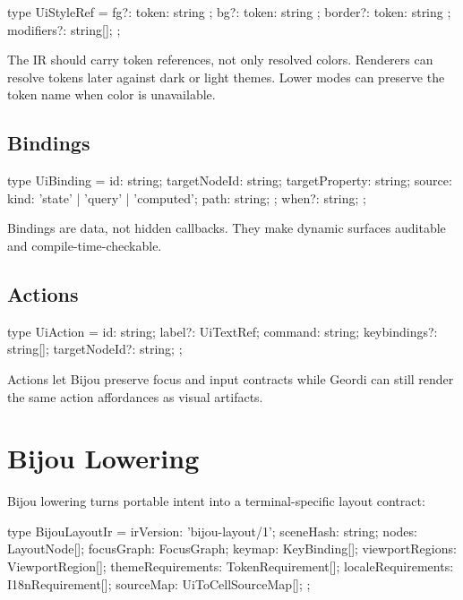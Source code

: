 \begin{CodeBlock}
type UiStyleRef = {
  fg?: { token: string };
  bg?: { token: string };
  border?: { token: string };
  modifiers?: string[];
};
\end{CodeBlock}

The IR should carry token references, not only resolved colors. Renderers can resolve tokens later against dark or light themes. Lower modes can preserve the token name when color is unavailable.

\subsection{Bindings}\label{record-138-bindings}

\begin{CodeBlock}
type UiBinding = {
  id: string;
  targetNodeId: string;
  targetProperty: string;
  source: {
    kind: 'state' | 'query' | 'computed';
    path: string;
  };
  when?: string;
};
\end{CodeBlock}

Bindings are data, not hidden callbacks. They make dynamic surfaces auditable and compile-time-checkable.

\subsection{Actions}\label{record-138-actions}

\begin{CodeBlock}
type UiAction = {
  id: string;
  label?: UiTextRef;
  command: string;
  keybindings?: string[];
  targetNodeId?: string;
};
\end{CodeBlock}

Actions let Bijou preserve focus and input contracts while Geordi can still render the same action affordances as visual artifacts.

\section{Bijou Lowering}\label{record-138-bijou-lowering}

Bijou lowering turns portable intent into a terminal-specific layout contract:

\begin{CodeBlock}
type BijouLayoutIr = {
  irVersion: 'bijou-layout/1';
  sceneHash: string;
  nodes: LayoutNode[];
  focusGraph: FocusGraph;
  keymap: KeyBinding[];
  viewportRegions: ViewportRegion[];
  themeRequirements: TokenRequirement[];
  localeRequirements: I18nRequirement[];
  sourceMap: UiToCellSourceMap[];
};
\end{CodeBlock}

